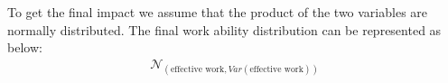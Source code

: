 To get the final impact we assume that the product of the two variables are normally distributed. The final work ability distribution can be represented as below:
\begin{equation}
\begin{aligned}
    \label{Eq:Final_Result_Heat}
     \mathcal{N}_{\left(\text{effective work}, Var\left(\text{effective work}\right)\right)}
      \end{aligned}
\end{equation}
\setcounter{secnumdepth}{3}